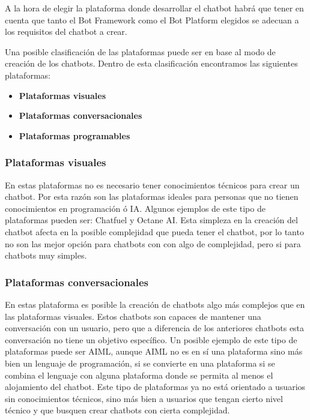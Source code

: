 A la hora de elegir la plataforma donde desarrollar el chatbot habrá que tener en cuenta que tanto el Bot Framework como el Bot Platform elegidos se adecuan a los requisitos del chatbot a crear.

Una posible clasificación de las plataformas puede ser en base al modo de creación de los chatbots. Dentro de esta clasificación encontramos las siguientes plataformas:

\begin{itemize}
    \item \textbf{Plataformas visuales}
    \item \textbf{Plataformas conversacionales}
    \item \textbf{Plataformas programables}
\end{itemize}

\subsubsection*{Plataformas visuales}

En estas plataformas no es necesario tener conocimientos técnicos para crear un chatbot. Por esta razón son las plataformas ideales para personas que no tienen conocimientos en programación ó IA. Algunos ejemplos de este tipo de plataformas pueden ser: Chatfuel y Octane AI. Esta simpleza en la creación del chatbot afecta en la posible complejidad que pueda tener el chatbot, por lo tanto no son las mejor opción para chatbots con con algo de complejidad, pero si para chatbots muy simples.

\subsubsection*{Plataformas conversacionales}

En estas plataforma es posible la creación de chatbots algo más complejos que en las plataformas visuales. Estos chatbots son capaces de mantener una conversación con un usuario, pero que a diferencia de los anteriores chatbots esta conversación no tiene un objetivo específico. Un posible ejemplo de este tipo de plataformas puede ser AIML, aunque AIML no es en sí una plataforma sino más bien un lenguaje de programación, si se convierte en una plataforma si se combina el lenguaje con alguna plataforma donde se permita al menos el alojamiento del chatbot. Este tipo de plataformas ya no está orientado a usuarios sin conocimientos técnicos, sino más bien a usuarios que tengan cierto nivel técnico y que busquen crear chatbots con cierta complejidad. 

